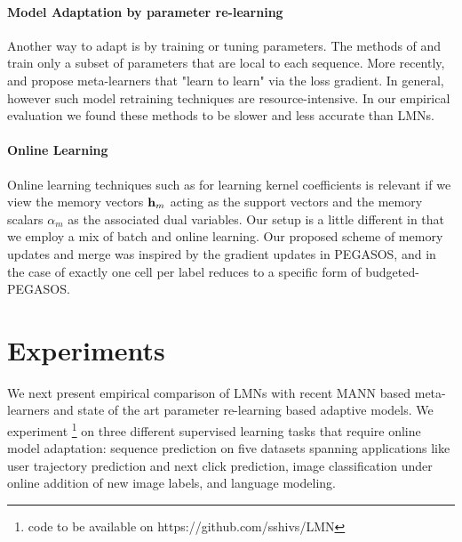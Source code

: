 \documentclass[letterpaper]{article} %
\newcommand{\vek}[1]{{\bf {#1}}}
\newcommand{\vh}{{\vek{h}}}
\begin{document}
\paragraph{Model Adaptation by parameter re-learning}
Another way to adapt is by training or tuning parameters. The methods of \cite{Rei15} and \cite{Huang2015MaximumAP} train only a subset of parameters that are local to each sequence.  More recently,\cite{Finn2017ModelAgnosticMF} and \cite{ravi17} propose meta-learners that "learn to learn" via
the loss gradient. In general, however such model retraining techniques are resource-intensive. In our empirical evaluation we found these methods to be slower and less accurate than LMNs.

\paragraph{Online Learning} Online learning techniques such as \cite{shalevshwartz:icml07} for learning kernel coefficients is relevant if we view the memory vectors $ \vh_m$ acting as the support vectors and the memory scalars $\alpha_m$ as the associated dual variables.  Our setup is a little different in that we employ a mix of batch and online learning. Our proposed scheme of memory updates and merge was inspired by the gradient updates in PEGASOS, and in the case of exactly one cell per label reduces to a specific form of budgeted-PEGASOS\cite{WangCV10}.





\section{Experiments}
We next present empirical comparison of LMNs with recent MANN based meta-learners and state of the art parameter re-learning based adaptive models. We experiment \footnote{code to be available on https://github.com/sshivs/LMN} on three different supervised learning tasks that require online model adaptation: sequence prediction on five datasets spanning applications like user trajectory prediction and next click prediction,  image classification under online addition of new image labels, and language modeling.
\end{document}
